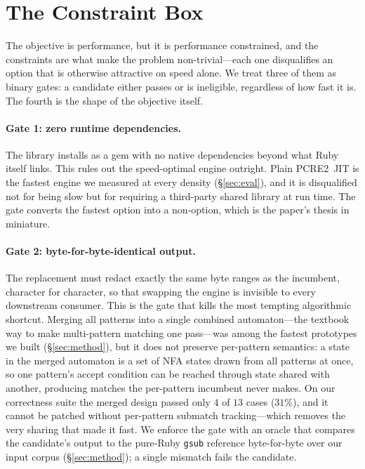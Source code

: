 \documentclass[acmsmall,nonacm,screen]{acmart}
\begin{document}
\section{The Constraint Box}
\label{sec:constraints}
The objective is performance, but it is performance constrained, and the
constraints are what make the problem non-trivial---each one disqualifies an
option that is otherwise attractive on speed alone. We treat three of them as
binary gates: a candidate either passes or is ineligible, regardless of how fast
it is. The fourth is the shape of the objective itself.

\paragraph{Gate 1: zero runtime dependencies.} The library installs as a gem with
no native dependencies beyond what Ruby itself links. This rules out the
speed-optimal engine outright. Plain PCRE2~JIT is the fastest engine we measured
at every density (\S\ref{sec:eval}), and it is disqualified not for being slow but
for requiring a third-party shared library at run time. The gate converts the
fastest option into a non-option, which is the paper's thesis in miniature.

\paragraph{Gate 2: byte-for-byte-identical output.} The replacement must redact
exactly the same byte ranges as the incumbent, character for character, so that
swapping the engine is invisible to every downstream consumer. This is the gate
that kills the most tempting algorithmic shortcut. Merging all patterns into a
single combined automaton---the textbook way to make multi-pattern matching one
pass---was among the fastest prototypes we built (\S\ref{sec:method}), but it does
not preserve per-pattern semantics: a state in the merged automaton is a set of
NFA states drawn from all patterns at once, so one pattern's accept condition can
be reached through state shared with another, producing matches the per-pattern
incumbent never makes. On our correctness suite the merged design passed only
\(4\) of \(13\) cases (\(31\%\)), and it cannot be patched without per-pattern
submatch tracking---which removes the very sharing that made it fast. We enforce
the gate with an oracle that compares the candidate's output to the pure-Ruby
\texttt{gsub} reference byte-for-byte over our input corpus (\S\ref{sec:method});
a single mismatch fails the candidate.
\end{document}
